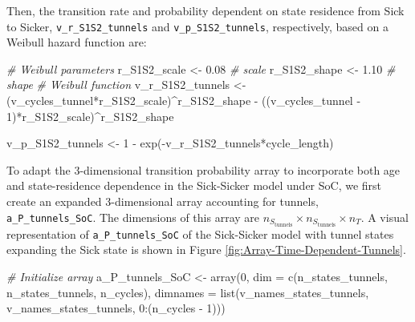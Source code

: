 \documentclass[
]{article}
\newenvironment{Shaded}{\begin{snugshade}}{\end{snugshade}}
\newcommand{\AttributeTok}[1]{\textcolor[rgb]{0.77,0.63,0.00}{#1}}
\newcommand{\CommentTok}[1]{\textcolor[rgb]{0.56,0.35,0.01}{\textit{#1}}}
\newcommand{\DecValTok}[1]{\textcolor[rgb]{0.00,0.00,0.81}{#1}}
\newcommand{\FloatTok}[1]{\textcolor[rgb]{0.00,0.00,0.81}{#1}}
\newcommand{\FunctionTok}[1]{\textcolor[rgb]{0.00,0.00,0.00}{#1}}
\newcommand{\NormalTok}[1]{#1}
\newcommand{\OtherTok}[1]{\textcolor[rgb]{0.56,0.35,0.01}{#1}}
\newcommand{\SpecialCharTok}[1]{\textcolor[rgb]{0.00,0.00,0.00}{#1}}
\begin{document}
Then, the transition rate and probability dependent on state residence from Sick to Sicker, \texttt{v\_r\_S1S2\_tunnels} and \texttt{v\_p\_S1S2\_tunnels}, respectively, based on a Weibull hazard function are:

\begin{Shaded}
\begin{Highlighting}[]
\CommentTok{\# Weibull parameters}
\NormalTok{r\_S1S2\_scale }\OtherTok{\textless{}{-}} \FloatTok{0.08} \CommentTok{\# scale}
\NormalTok{r\_S1S2\_shape }\OtherTok{\textless{}{-}} \FloatTok{1.10} \CommentTok{\# shape}
\CommentTok{\# Weibull function}
\NormalTok{v\_r\_S1S2\_tunnels }\OtherTok{\textless{}{-}}\NormalTok{ (v\_cycles\_tunnel}\SpecialCharTok{*}\NormalTok{r\_S1S2\_scale)}\SpecialCharTok{\^{}}\NormalTok{r\_S1S2\_shape }\SpecialCharTok{{-}}
\NormalTok{                    ((v\_cycles\_tunnel }\SpecialCharTok{{-}} \DecValTok{1}\NormalTok{)}\SpecialCharTok{*}\NormalTok{r\_S1S2\_scale)}\SpecialCharTok{\^{}}\NormalTok{r\_S1S2\_shape}
                    
\NormalTok{v\_p\_S1S2\_tunnels }\OtherTok{\textless{}{-}} \DecValTok{1} \SpecialCharTok{{-}} \FunctionTok{exp}\NormalTok{(}\SpecialCharTok{{-}}\NormalTok{v\_r\_S1S2\_tunnels}\SpecialCharTok{*}\NormalTok{cycle\_length)}
\end{Highlighting}
\end{Shaded}

To adapt the 3-dimensional transition probability array to incorporate both age and state-residence dependence in the Sick-Sicker model under SoC, we first create an expanded 3-dimensional array accounting for tunnels, \texttt{a\_P\_tunnels\_SoC}. The dimensions of this array are \(n_{S_{\text{tunnels}}} \times n_{S_{\text{tunnels}}} \times n_T\). A visual representation of \texttt{a\_P\_tunnels\_SoC} of the Sick-Sicker model with tunnel states expanding the Sick state is shown in Figure \ref{fig:Array-Time-Dependent-Tunnels}.

\begin{Shaded}
\begin{Highlighting}[]
\CommentTok{\# Initialize array}
\NormalTok{a\_P\_tunnels\_SoC }\OtherTok{\textless{}{-}} \FunctionTok{array}\NormalTok{(}\DecValTok{0}\NormalTok{, }\AttributeTok{dim =} \FunctionTok{c}\NormalTok{(n\_states\_tunnels, n\_states\_tunnels, n\_cycles),}
                         \AttributeTok{dimnames =} \FunctionTok{list}\NormalTok{(v\_names\_states\_tunnels, }
\NormalTok{                                         v\_names\_states\_tunnels, }
                                         \DecValTok{0}\SpecialCharTok{:}\NormalTok{(n\_cycles }\SpecialCharTok{{-}} \DecValTok{1}\NormalTok{)))}
\end{Highlighting}
\end{Shaded}
\end{document}
